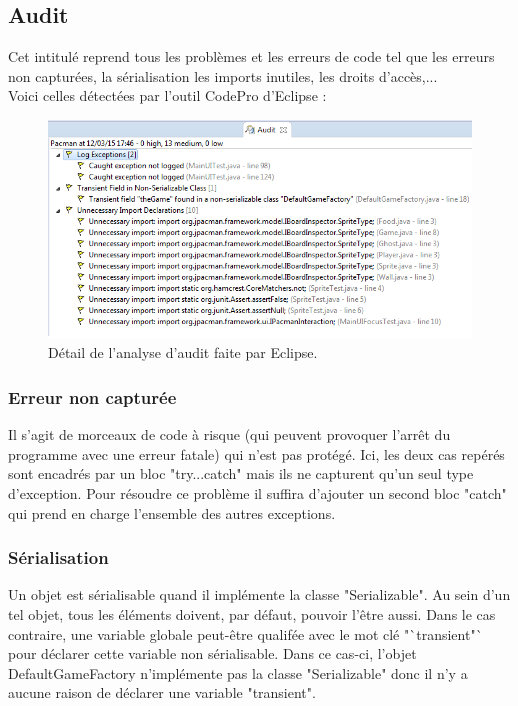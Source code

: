\documentclass[12pt,a4paper,final]{article}
\begin{document}
\subsection{Audit}
Cet intitulé reprend tous les problèmes et les erreurs de code tel que les erreurs non capturées, la sérialisation les imports inutiles, les droits d'accès,...\\
Voici celles détectées par l'outil CodePro d'Eclipse : 
\begin{figure}[!h]
	\centering
	\includegraphics[width=\textwidth]{Audit.png}
	\caption{\label{Audit}Détail de l'analyse d'audit faite par Eclipse.}
\end{figure}

\subsubsection{Erreur non capturée}
Il s'agit de morceaux de code à risque (qui peuvent provoquer l'arrêt du programme avec une erreur fatale) qui n'est pas protégé.
Ici, les deux cas repérés sont encadrés par un bloc "try...catch" mais ils ne capturent qu'un seul type d'exception. Pour résoudre ce problème il suffira d'ajouter un second bloc "catch" qui prend en charge l'ensemble des autres exceptions.

\subsubsection{Sérialisation}
Un objet est sérialisable quand il implémente la classe "Serializable". Au sein d'un tel objet, tous les éléments doivent, par défaut, pouvoir l'être aussi. Dans le cas contraire, une variable globale peut-être qualifée avec le mot clé "`transient"` pour déclarer cette variable non sérialisable.
Dans ce cas-ci, l'objet DefaultGameFactory n'implémente pas la classe "Serializable" donc il n'y a aucune raison de déclarer une variable "transient".
\end{document}
